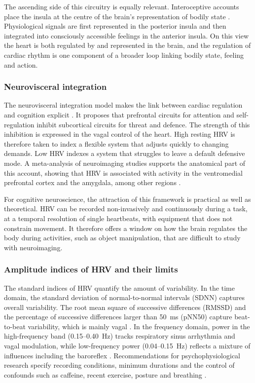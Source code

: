 The ascending side of this circuitry is equally relevant. Interoceptive accounts place the insula at the centre of the brain's representation of bodily state \citep{craig2002}. Physiological signals are first represented in the posterior insula and then integrated into consciously accessible feelings in the anterior insula. On this view the heart is both regulated by and represented in the brain, and the regulation of cardiac rhythm is one component of a broader loop linking bodily state, feeling and action.

\subsubsection{Neurovisceral integration}

The neurovisceral integration model makes the link between cardiac regulation and cognition explicit \citep{thayer2000}. It proposes that prefrontal circuits for attention and self-regulation inhibit subcortical circuits for threat and defence. The strength of this inhibition is expressed in the vagal control of the heart. High resting HRV is therefore taken to index a flexible system that adjusts quickly to changing demands. Low HRV indexes a system that struggles to leave a default defensive mode. A meta-analysis of neuroimaging studies supports the anatomical part of this account, showing that HRV is associated with activity in the ventromedial prefrontal cortex and the amygdala, among other regions \citep{thayer2012}.

For cognitive neuroscience, the attraction of this framework is practical as well as theoretical. HRV can be recorded non-invasively and continuously during a task, at a temporal resolution of single heartbeats, with equipment that does not constrain movement. It therefore offers a window on how the brain regulates the body during activities, such as object manipulation, that are difficult to study with neuroimaging.

\subsubsection{Amplitude indices of HRV and their limits}

The standard indices of HRV quantify the amount of variability. In the time domain, the standard deviation of normal-to-normal intervals (SDNN) captures overall variability. The root mean square of successive differences (RMSSD) and the percentage of successive differences larger than 50~ms (pNN50) capture beat-to-beat variability, which is mainly vagal \citep{taskforce1996}. In the frequency domain, power in the high-frequency band (0.15--0.40~Hz) tracks respiratory sinus arrhythmia and vagal modulation, while low-frequency power (0.04--0.15~Hz) reflects a mixture of influences including the baroreflex \citep{taskforce1996}. Recommendations for psychophysiological research specify recording conditions, minimum durations and the control of confounds such as caffeine, recent exercise, posture and breathing \citep{laborde2017}.


